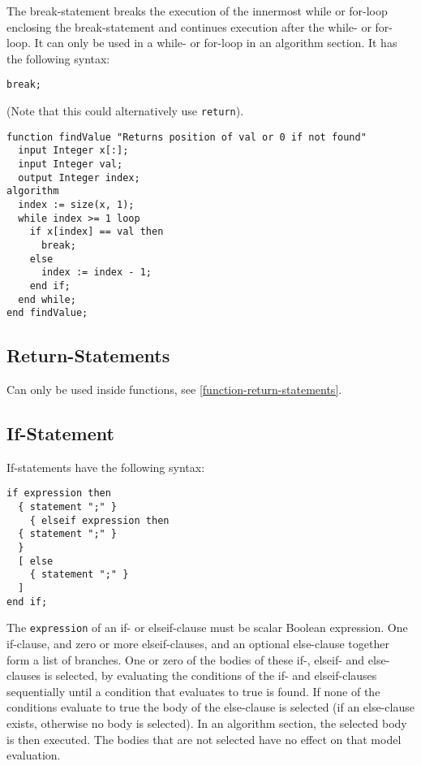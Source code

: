 The break-statement breaks the execution of the innermost while or
for-loop enclosing the break-statement and continues execution after the
while- or for-loop. It can only be used in a while- or for-loop in an
algorithm section. It has the following syntax:
\begin{lstlisting}[language=modelica]
break;
\end{lstlisting}

\begin{example}
(Note that this could alternatively use \lstinline!return!).
\begin{lstlisting}[language=modelica]
function findValue "Returns position of val or 0 if not found"
  input Integer x[:];
  input Integer val;
  output Integer index;
algorithm
  index := size(x, 1);
  while index >= 1 loop
    if x[index] == val then
      break;
    else
      index := index - 1;
    end if;
  end while;
end findValue;
\end{lstlisting}
\end{example}

\subsection{Return-Statements}\label{return-statements}

Can only be used inside functions, see \cref{function-return-statements}.

\subsection{If-Statement}\label{if-statement}

If-statements have the following syntax:
\begin{lstlisting}[language=grammar]
if expression then
  { statement ";" }
    { elseif expression then
  { statement ";" }
  }
  [ else
    { statement ";" }
  ]
end if;
\end{lstlisting}

The \lstinline!expression! of an if- or elseif-clause must be scalar Boolean
expression. One if-clause, and zero or more elseif-clauses, and an
optional else-clause together form a list of branches. One or zero of
the bodies of these if-, elseif- and else-clauses is selected, by
evaluating the conditions of the if- and elseif-clauses sequentially
until a condition that evaluates to true is found. If none of the
conditions evaluate to true the body of the else-clause is selected (if
an else-clause exists, otherwise no body is selected). In an algorithm
section, the selected body is then executed. The bodies that are not
selected have no effect on that model evaluation.

